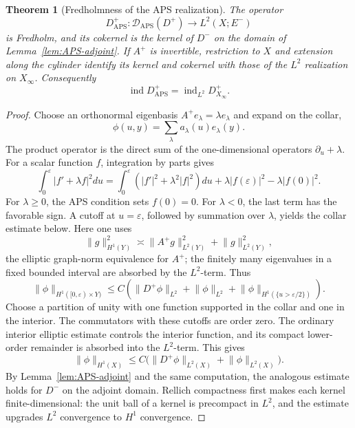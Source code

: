 \documentclass[12pt,oneside,reqno]{article}
\theoremstyle{plain}
\newtheorem{theorem}{Theorem}[section]
\theoremstyle{definition}
\theoremstyle{remark}
\begin{document}
\begin{theorem}[Fredholmness of the APS realization]
The operator
\[
 D^+_{\mathrm{APS}}:
 \mathcal D_{\mathrm{APS}}(D^+)
 \longrightarrow L^2(X;E^-)
\]
is Fredholm, and its cokernel is the kernel of \(D^-\) on the domain of
Lemma~\ref{lem:APS-adjoint}. If \(A^+\) is invertible, restriction to \(X\)
and extension along the cylinder identify its kernel and cokernel with
those of the \(L^2\) realization on \(X_\infty\). Consequently
\[
 \operatorname{ind}D^+_{\mathrm{APS}}
 =\operatorname{ind}_{L^2}D^+_{X_\infty}.
\]
\end{theorem}

\begin{proof}
Choose an orthonormal eigenbasis \(A^+e_\lambda=\lambda e_\lambda\)
and expand on the collar,
\[
 \phi(u,y)=\sum_\lambda a_\lambda(u)e_\lambda(y).
\]
The product operator is the direct sum of the one-dimensional operators
\(\partial_u+\lambda\).  For a scalar function \(f\), integration by
parts gives
\[
 \int_0^\varepsilon|f'+\lambda f|^2du
 =\int_0^\varepsilon(|f'|^2+\lambda^2|f|^2)du
   +\lambda|f(\varepsilon)|^2-\lambda|f(0)|^2.
\]
For \(\lambda\geq0\), the APS condition sets \(f(0)=0\).  For
\(\lambda<0\), the last term has the favorable sign.  A cutoff at
\(u=\varepsilon\), followed by summation over \(\lambda\), yields the
collar estimate below.  Here one uses
\[
 \lVert g\rVert_{H^1(Y)}^2
 \asymp \lVert A^+g\rVert_{L^2(Y)}^2+\lVert g\rVert_{L^2(Y)}^2,
\]
the elliptic graph-norm equivalence for \(A^+\); the finitely many
eigenvalues in a fixed bounded interval are absorbed by the \(L^2\)-term.
Thus
\[
 \lVert \phi\rVert_{H^1([0,\varepsilon)\times Y)}
 \leq C\left(
 \lVert D^+\phi\rVert_{L^2}
 +\lVert \phi\rVert_{L^2}
 +\lVert \phi\rVert_{H^1(\{u>\varepsilon/2\})}
 \right).
\]
Choose a partition of unity with one function supported in the collar and
one in the interior. The commutators with these cutoffs are order zero.
The ordinary interior elliptic estimate controls the interior function,
and its compact lower-order remainder is absorbed into the \(L^2\)-term.
This gives
\[
 \lVert \phi\rVert_{H^1(X)}
 \leq C\bigl(\lVert D^+\phi\rVert_{L^2(X)}
              +\lVert \phi\rVert_{L^2(X)}\bigr).
\]
By Lemma~\ref{lem:APS-adjoint} and the same computation, the analogous
estimate holds for \(D^-\) on the adjoint domain. Rellich
compactness first makes each kernel finite-dimensional: the unit ball of a
kernel is precompact in \(L^2\), and the estimate upgrades \(L^2\)
convergence to \(H^1\) convergence.


\end{proof}
\end{document}
